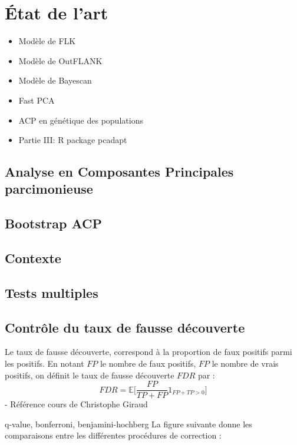 \documentclass[12pt,twoside]{reedthesis}
\begin{document}
  \chapter{État de l'art}\label{etat-de-lart}
  
  \begin{itemize}
  \item
    Modèle de FLK
  \item
    Modèle de OutFLANK
  \item
    Modèle de Bayescan
  \item
    Fast PCA
  \item
    ACP en génétique des populations
  \item
    Partie III: R package pcadapt
  \end{itemize}
  
  \section{Analyse en Composantes Principales
  parcimonieuse}\label{analyse-en-composantes-principales-parcimonieuse}
  
  \section{Bootstrap ACP}\label{bootstrap-acp}
  
  \section{Contexte}\label{contexte}
  
  \section{Tests multiples}\label{tests-multiples}
  
  \section{Contrôle du taux de fausse
  découverte}\label{controle-du-taux-de-fausse-decouverte}
  
  Le taux de fausse découverte, correspond à la proportion de faux
  positifs parmi les positifs. En notant \(FP\) le nombre de faux
  positifs, \(FP\) le nombre de vrais positifs, on définit le taux de
  fausse découverte \(FDR\) par :
  \[ FDR = \mathbb{E}\Big[\frac{FP}{TP + FP} 1_{FP+TP > 0}\Big] \] -
  Référence cours de Christophe Giraud
  
  q-value, bonferroni, benjamini-hochberg La figure suivante donne les
  comparaisons entre les différentes procédures de correction :
  
\end{document}
